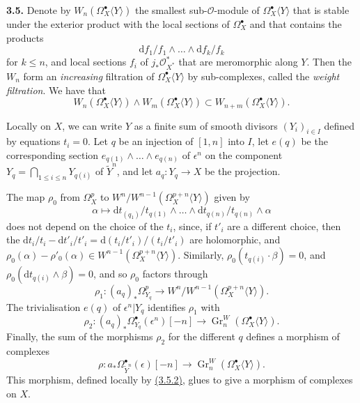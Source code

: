 \documentclass{report}
\newenvironment{rmenv}[1]
  {\phantomsection\par\medskip\noindent\textbf{#1.}\rmfamily}
  {\medskip}
\renewcommand{\cal}[1]{{\mathcal{#1}}}
\newcommand{\dd}{\mathrm{d}}
\renewcommand{\leq}{\leqslant}
\DeclareMathOperator{\Gr}{Gr}
\newcommand{\oldpage}[1]{\marginpar{\footnotesize$\Big\vert$ \textit{p.~#1}}}
\begin{document}
\begin{rmenv}{3.5}
\label{II.3.5}
  Denote by $W_n(\Omega_X^\bullet\langle Y\rangle)$ the smallest sub-$\cal{O}$-module of $\Omega_X^\bullet\langle Y\rangle$ that is stable under the exterior product with the local sections of $\Omega_X^\bullet$ and that contains the products
  \[
    \dd f_1/f_1\wedge\ldots\wedge\dd f_k/f_k
  \]
\oldpage{76}
  for $k\leq n$, and local sections $f_i$ of $j_*\cal{O}_{X^*}^*$ that are meromorphic along $Y$.
  Then the $W_n$ form an \emph{increasing} filtration of $\Omega_X^\bullet\langle Y\rangle$ by sub-complexes, called the \emph{weight filtration}.
  We have that
  \[
  \label{II.3.5.1}
    W_n(\Omega_X^\bullet\langle Y\rangle) \wedge W_m(\Omega_X^\bullet\langle Y\rangle)
    \subset W_{n+m}(\Omega_X^\bullet\langle Y\rangle).
  \tag{3.5.1}
  \]

  Locally on $X$, we can write $Y$ as a finite sum of smooth divisors $(Y_i)_{i\in I}$ defined by equations $t_i=0$.
  Let $q$ be an injection of $[1,n]$ into $I$, let $e(q)$ be the corresponding section $e_{q(1)}\wedge\ldots\wedge e_{q(n)}$ of $\epsilon^n$ on the component $Y_q=\bigcap_{1\leq i\leq n}Y_{q(i)}$ of $\widetilde{Y}^n$, and let $a_q\colon Y_q\to X$ be the projection.

  The map $\rho_0$ from $\Omega_X^p$ to $W^n/W^{n-1}(\Omega_X^{p+n}\langle Y\rangle)$ given by
  \[
  \label{II.3.5.2}
    \alpha
    \longmapsto \dd t_{(q_1)}/t_{q(1)}\wedge\ldots\wedge\dd t_{q(n)}/t_{q(n)}\wedge\alpha
  \tag{3.5.2}
  \]
  does not depend on the choice of the $t_i$, since, if $t'_i$ are a different choice, then the $\dd t_i/t_i-\dd t'_i/t'_i=\dd(t_i/t'_i)/(t_i/t'_i)$ are holomorphic, and $\rho_0(\alpha)-\rho'_0(\alpha)\in W^{n-1}(\Omega_X^{p+n}\langle Y\rangle)$.
  Similarly, $\rho_0(t_{q(i)}\cdot\beta)=0$, and $\rho_0(\dd t_{q(i)}\wedge\beta)=0$, and so $\rho_0$ factors through
  \[
    \rho_1\colon (a_q)_*\Omega_{Y_q}^p \to W^n/W^{n-1}(\Omega_X^{p+n}\langle Y\rangle).
  \]
  The trivialisation $e(q)$ of $\epsilon^n|Y_q$ identifies $\rho_1$ with
  \[
    \rho_2\colon (a_q)_*\Omega_{Y_q}^\bullet(\epsilon^n)[-n] \to \Gr_n^W(\Omega_X^\bullet\langle Y\rangle).
  \]
  Finally, the sum of the morphisms $\rho_2$ for the different $q$ defines a morphism of complexes
  \[
  \label{II.3.5.3}
    \rho\colon a_*\Omega_{\widetilde{Y}^n}^\bullet(\epsilon)[-n] \to \Gr_n^W(\Omega_X^\bullet\langle Y\rangle).
  \tag{3.5.3}
  \]
  This morphism, defined locally by \hyperref[II.3.5.2]{(3.5.2)}, glues to give a morphism of complexes on $X$.
\end{rmenv}
\end{document}
